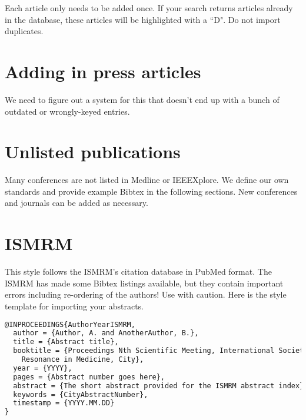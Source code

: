 \documentclass{InsightArticle}
\begin{document}
Each article only needs to be added once. If your search returns articles already in the database, these articles will be highlighted with a ``D". Do not import duplicates.


\section{Adding in press articles}

We need to figure out a system for this that doesn't end up with a bunch of outdated or wrongly-keyed entries.


\section{Unlisted publications}

Many conferences are not listed in Medline or IEEEXplore.  We define our own standards and provide example Bibtex in the following sections. New conferences and journals can be added as necessary. 

\section{ISMRM}

This style follows the ISMRM's citation database in PubMed format. The ISMRM has made some Bibtex listings available, but they contain important errors including re-ordering of the authors! Use with caution. Here is the style template for importing your abstracts.

\begin{lstlisting}[language=TeX]
@INPROCEEDINGS{AuthorYearISMRM,
  author = {Author, A. and AnotherAuthor, B.},
  title = {Abstract title},
  booktitle = {Proceedings Nth Scientific Meeting, International Society for Magnetic
	Resonance in Medicine, City},
  year = {YYYY},
  pages = {Abstract number goes here},
  abstract = {The short abstract provided for the ISMRM abstract index},
  keywords = {CityAbstractNumber},
  timestamp = {YYYY.MM.DD}
}
\end{lstlisting}





\end{document}
